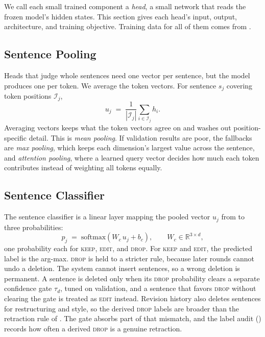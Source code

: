 \documentclass[]{paper}
\newcommand{\keep}{\textsc{keep}}
\newcommand{\edit}{\textsc{edit}}
\newcommand{\drop}{\textsc{drop}}
\begin{document}
We call each small trained component a \emph{head}, a small network that reads the frozen model's hidden states. This section gives each head's input, output, architecture, and training objective. Training data for all of them comes from .

\subsection{Sentence Pooling}
\label{sec:pooling}

Heads that judge whole sentences need one vector per sentence, but the model produces one per token. We average the token vectors. For sentence $s_j$ covering token positions $\mathcal{I}_j$,
\begin{equation}
u_j \;=\; \frac{1}{|\mathcal{I}_j|} \sum_{i \in \mathcal{I}_j} h_i .
\label{eq:pool}
\end{equation}
Averaging vectors keeps what the token vectors agree on and washes out position-specific detail. This is \emph{mean pooling}. If validation results are poor, the fallbacks are \emph{max pooling}, which keeps each dimension's largest value across the sentence, and \emph{attention pooling}, where a learned query vector decides how much each token contributes instead of weighting all tokens equally.

\subsection{Sentence Classifier}
\label{sec:cls}

The sentence classifier is a linear layer mapping the pooled vector $u_j$ from  to three probabilities:
\begin{equation}
p_j \;=\; \mathrm{softmax}\!\left(W_c\, u_j + b_c\right),
\qquad W_c \in \mathbb{R}^{3 \times d},
\label{eq:cls}
\end{equation}
one probability each for \keep{}, \edit{}, and \drop{}. For \keep{} and \edit{}, the predicted label is the arg-max. \drop{} is held to a stricter rule, because later rounds cannot undo a deletion. The system cannot insert sentences, so a wrong deletion is permanent. A sentence is deleted only when its \drop{} probability clears a separate confidence gate $\tau_d$, tuned on validation, and a sentence that favors \drop{} without clearing the gate is treated as \edit{} instead. Revision history also deletes sentences for restructuring and style, so the derived \drop{} labels are broader than the retraction rule of . The gate absorbs part of that mismatch, and the label audit () records how often a derived \drop{} is a genuine retraction.
\end{document}
